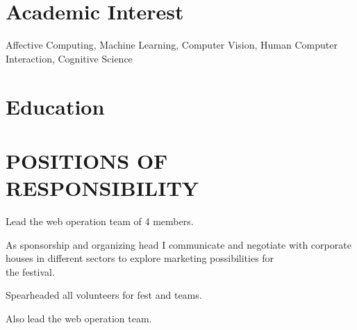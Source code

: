 \documentclass[]{space-monkey-cv}
\begin{document}
\lastupdated

%
%







\sectionsep

\section{Academic Interest}
Affective Computing, Machine Learning, Computer Vision, Human Computer Interaction, Cognitive Science
\sectionsep


\section{Education}
\sectionsep

\sectionsep


\sectionsep


%






\section{POSITIONS OF RESPONSIBILITY}
\begin{tightemize}
	\item Lead the web operation team of 4 members.
\end{tightemize}

\begin{tightemize}
	\item As sponsorship and organizing head I communicate and negotiate with corporate houses in different sectors to explore marketing possibilities for \\ the festival.
	\item Spearheaded all volunteers for fest and teams.
	\item Also lead the web operation team.
\end{tightemize}
\sectionsep
\end{document}
